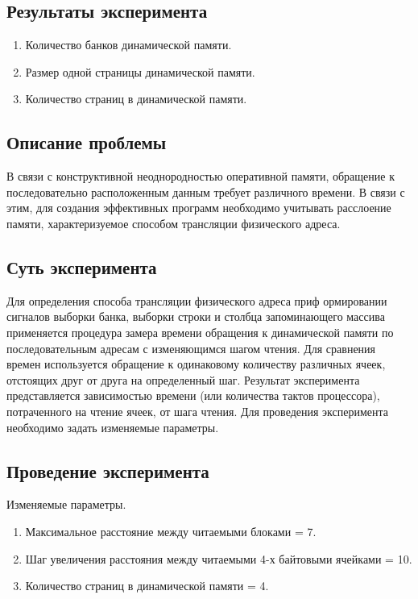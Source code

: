 \subsection{Результаты эксперимента}
\begin{enumerate}
	\item Количество банков динамической памяти.
	\item Размер одной страницы динамической памяти.
	\item Количество страниц в динамической памяти.
\end{enumerate}


\subsection{Описание проблемы}
В связи с конструктивной неоднородностью   оперативной памяти,   обращение к последовательно расположенным данным   требует различного времени. В связи с этим, для создания эффективных программ необходимо учитывать расслоение памяти, характеризуемое способом трансляции физического адреса. 

\subsection{Суть эксперимента}  
Для определения способа трансляции физического адреса приф ормировании сигналов выборки банка, выборки строки и столбца запоминающего массива применяется   процедура   замера   времени   обращения   к   динамической   памяти   по последовательным   адресам   с   изменяющимся   шагом   чтения.   Для   сравнения   времен используется обращение к одинаковому количеству различных ячеек,  отстоящих друг от друга   на   определенный шаг. Результат эксперимента представляется зависимостью времени (или количества тактов процессора), потраченного на чтение ячеек, от шага чтения. Для проведения эксперимента необходимо задать изменяемые параметры.

\subsection{Проведение эксперимента}

Изменяемые параметры.

\begin{enumerate}
	\item Максимальное расстояние между читаемыми блоками = 7.
	\item Шаг увеличения расстояния между читаемыми 4-х байтовыми ячейками = 10.
	\item Количество страниц в динамической памяти = 4.
\end{enumerate}


